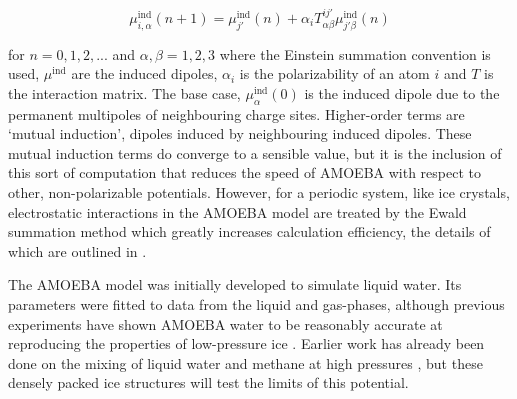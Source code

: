 \begin{equation}
    \mu^{\mathrm{ind}}_{i,\alpha}(n+1) = \mu^{\mathrm{ind}}_{j'}(n) + \alpha_iT^{ij'}_{\alpha\beta}\mu^{\mathrm{ind}}_{j'\beta}(n)
    \label{eqn:ind-dip}
\end{equation}

for $n = 0, 1, 2, ...$ and $\alpha, \beta = 1, 2, 3$ 
where the Einstein summation convention is used, $\mu^{\mathrm{ind}}$ are the induced dipoles,
$\alpha_i$ is the polarizability of an atom $i$ and $T$ is the interaction matrix.
The base case, $\mu^{\mathrm{ind}}_{\alpha}(0)$ is the induced dipole due to the permanent multipoles
of neighbouring charge sites.
Higher-order terms are `mutual induction', dipoles induced by neighbouring induced dipoles.
These mutual induction terms do converge to a sensible value, but it is the inclusion of this sort of
computation that reduces the speed of AMOEBA with respect to other, non-polarizable potentials.
However, for a periodic system, like ice crystals, electrostatic interactions in the AMOEBA model are treated
by the Ewald summation method which greatly increases calculation efficiency, the details of which are 
outlined in \cite{smith1998}.

\par
The AMOEBA model was initially developed to simulate liquid water.
Its parameters were fitted to data from the liquid and gas-phases, although previous experiments have shown AMOEBA 
water to be reasonably accurate at reproducing the properties of low-pressure ice \cite{ren2004}.
Earlier work has already been done on the mixing of liquid water and methane at high pressures \cite{kerr2024},
but these densely packed ice structures will test the limits of this potential.

